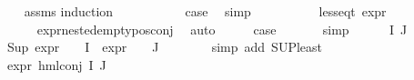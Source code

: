 \begin{isabellebody}
%
\isadelimproof
\ \ %
\endisadelimproof
%
\isatagproof
{}\isamarkupfalse%
\ assms\isanewline
{}\isamarkupfalse%
{\isacharparenleft}{\kern0pt}induction\ {\isasymphi}{\isacharparenright}{\kern0pt}\isanewline
\ \ \isamarkupfalse%
\ {}\isanewline
\ \ \isamarkupfalse%
\ \isamarkupfalse%
\ {\isacharquery}{\kern0pt}case\ \isamarkupfalse%
\ simp\isanewline
{}\isamarkupfalse%
\isanewline
\ \ \isamarkupfalse%
\ {\isacharparenleft}{\kern0pt}{}\ {\isasympsi}\ {\isasymalpha}{\isacharparenright}{\kern0pt}\isanewline
\ \ \isamarkupfalse%
\ {\isachardoublequoteopen}less{\isacharunderscore}{\kern0pt}eq{\isacharunderscore}{\kern0pt}t\ {\isacharparenleft}{\kern0pt}expr\ {\isasympsi}{\isacharparenright}{\kern0pt}\ {\isacharparenleft}{\kern0pt}{}{\isacharcomma}{\kern0pt}\ {\isasyminfinity}{\isacharcomma}{\kern0pt}\ {}{\isacharcomma}{\kern0pt}\ {}{\isacharcomma}{\kern0pt}\ {}{\isacharcomma}{\kern0pt}\ {}{\isacharparenright}{\kern0pt}{\isachardoublequoteclose}\isanewline
\ \ \ \ \isamarkupfalse%
\ expr{\isacharunderscore}{\kern0pt}nested{\isacharunderscore}{\kern0pt}empty{\isacharunderscore}{\kern0pt}pos{\isacharunderscore}{\kern0pt}conj\ \isamarkupfalse%
\ auto\isanewline
\ \ \isamarkupfalse%
\ \isamarkupfalse%
\ {\isacharquery}{\kern0pt}case\ \isanewline
\ \ \ \ \isamarkupfalse%
\ simp\isanewline
{}\isamarkupfalse%
\isanewline
\ \ \isamarkupfalse%
\ {\isacharparenleft}{\kern0pt}{}\ {\isasymPhi}\ I\ J{\isacharparenright}{\kern0pt}\isanewline
\ \ \isamarkupfalse%
\ {\isachardoublequoteopen}Sup\ {\isacharparenleft}{\kern0pt}{\isacharparenleft}{\kern0pt}expr{\isacharunderscore}{\kern0pt}{}\ {\isasymcirc}\ {\isasymPhi}{\isacharparenright}{\kern0pt}\ {\isacharbackquote}{\kern0pt}\ I\ {\isasymunion}\ {\isacharparenleft}{\kern0pt}expr{\isacharunderscore}{\kern0pt}{}\ {\isasymcirc}\ {\isasymPhi}{\isacharparenright}{\kern0pt}\ {\isacharbackquote}{\kern0pt}\ J{\isacharparenright}{\kern0pt}\ {\isasymle}\ {}{\isachardoublequoteclose}\isanewline
\ \ \ \ \isamarkupfalse%
\ {\isacharparenleft}{\kern0pt}simp\ add{\isacharcolon}{\kern0pt}\ SUP{\isacharunderscore}{\kern0pt}least{\isacharparenright}{\kern0pt}\isanewline
\ \ \isamarkupfalse%
\ {\isachardoublequoteopen}expr{\isacharunderscore}{\kern0pt}{}\ {\isacharparenleft}{\kern0pt}hml{\isacharunderscore}{\kern0pt}conj\ I\ J\ {\isasymPhi}{\isacharparenright}{\kern0pt}\ {\isasymle}\ {}{\isachardoublequoteclose}\isanewline

\end{isabellebody}
